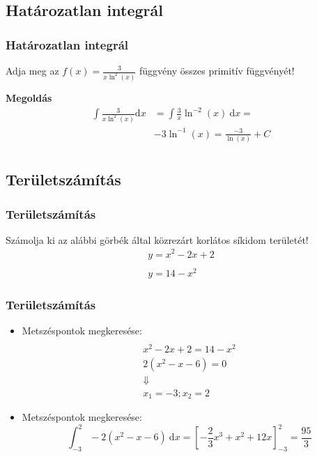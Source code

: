 \documentclass[ignorenonframetext]{beamer}
\begin{document}
\subsection{Határozatlan integrál}
\begin{frame}[fragile]
    \frametitle{Határozatlan integrál}
    \begin{center}
        Adja meg az $f(x)=\displaystyle\frac{3}{x\ln^2(x)}$ függvény összes primitív függvényét!
    \end{center}
    \textbf{Megoldás}
    \begin{align*}
        \int\frac{3}{x\ln^2(x)}\mathrm{d}x & = \int\frac{3}{x}\ln^{-2}(x)\ \mathrm{d}x= \\
                                           & -3\ln^{-1}(x)=\frac{-3}{\ln(x)}+C          \\
    \end{align*}
\end{frame}
\subsection{Területszámítás}
\begin{frame}[fragile]
    \frametitle{Területszámítás}
    Számolja ki az alábbi görbék által közrezárt korlátos síkidom területét!
    \begin{gather*}
        y=x^2-2x+2 \\
        \\
        y=14-x^2
    \end{gather*}
\end{frame}

\begin{frame}[fragile]
    \frametitle{Területszámítás}
    \begin{itemize}
        \item Metszéspontok megkeresése:
              \begin{gather*}
                  \\
                  x^2-2x+2=14-x^2\\
                  2(x^2-x-6)=0\\
                  \Downarrow\\
                  x_1=-3;x_2=2
              \end{gather*}
        \item Metszéspontok megkeresése:
              \[
                  \displaystyle\int_{-3}^{2}
                  -2(x^2-x-6)\ \mathrm{d}x=\left[-\frac{2}{3}x^3+x^2+12x\right]^2_{-3}=\frac{95}{3}
              \]
    \end{itemize}
\end{frame}
\end{document}
